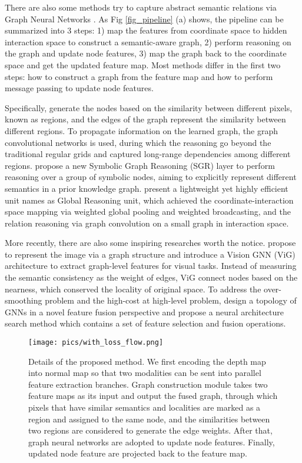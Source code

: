 ﻿\documentclass[journal]{IEEEtran}
\begin{document}
    
    There are also some methods try to capture abstract semantic relations via Graph Neural Networks \cite{li2018beyondgrids}\cite{liang2018symbolicRG}\cite{chen2019glore}. As Fig \ref{fig_pipeline} (a) shows, the pipeline can be summarized into 3 steps: 1) map the features from coordinate space to hidden interaction space to construct a semantic-aware graph, 2) perform reasoning on the graph and update node features, 3) map the graph back to the coordinate space and get the updated feature map. Most methods differ in the first two steps: how to construct a graph from the feature map and how to perform message passing to update node features. 
    
    
    Specifically, \cite{li2018beyondgrids} generate the nodes based on the similarity between different pixels, known as regions, and the edges of the graph represent the similarity between different regions. To propagate information on the learned graph, the graph convolutional networks is used\cite{kipf2016GCN}, during which the reasoning go beyond the traditional regular grids and captured long-range dependencies among different regions. \cite{liang2018symbolicRG} propose a new Symbolic Graph Reasoning (SGR) layer to perform reasoning over a group of symbolic nodes, aiming to explicitly represent different semantics in a prior knowledge graph.  \cite{chen2019glore} present a lightweight yet highly efficient unit names as Global Reasoning unit, which achieved the coordinate-interaction space mapping via weighted global pooling and weighted broadcasting, and the relation reasoning via graph convolution on a small graph in interaction space. 

    
    More recently, there are also some inspiring researches worth the notice. \cite{han2022VIG} propose to represent the image via a graph structure and introduce a Vision GNN (ViG) architecture to extract graph-level features for visual tasks. Instead of measuring the semantic consistency as the weight of edges, ViG connect nodes based on the nearness, which conserved the locality of original space. To address the over-smoothing problem and the high-cost at high-level problem, \cite{2022TopoGNNFusion} design a topology of GNNs in a novel feature fusion perspective and propose a neural architecture search method which contains a set of feature selection and fusion operations.

    \begin{figure*}
        \centering
        \texttt{[image: pics/with\_loss\_flow.png]}
        \caption{Details of the proposed method. We first encoding the depth map into normal map so that two modalities can be sent into parallel feature extraction branches. Graph construction module takes two feature maps as its input and output the fused graph, through which pixels that have similar semantics and localities are marked as a region and assigned to the same node, and the similarities between two regions are considered to generate the edge weights. After that, graph neural networks are adopted to update node features. Finally, updated node feature are projected back to the feature map. }
        \label{fig_overview}
    \end{figure*}
    
\end{document}

